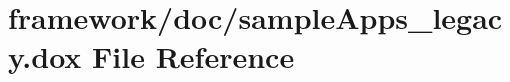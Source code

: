 \hypertarget{sample_apps__legacy_8dox}{}\section{framework/doc/sample\+Apps\+\_\+legacy.dox File Reference}
\label{sample_apps__legacy_8dox}
